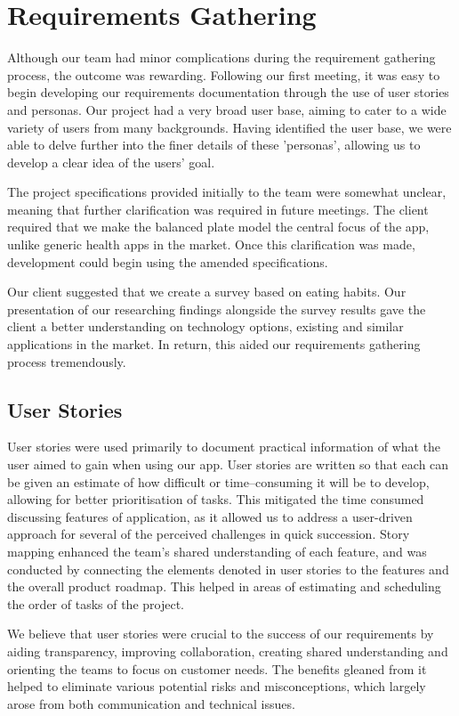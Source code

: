 \documentclass{l3proj}
\begin{document}
\section{Requirements Gathering}
\label{sec:requirements gathering}
Although our team had minor complications during the requirement gathering process, the outcome was rewarding. Following our first meeting, it was easy to begin developing our requirements documentation through the use of user stories and personas. Our project had a very broad user base, aiming to cater to a wide variety of users from many backgrounds. Having identified the user base, we were able to delve further into the finer details of these 'personas', allowing us to develop a clear idea of the users' goal.\par
The project specifications provided initially to the team were somewhat unclear, meaning that further clarification was required in future meetings. The client required that we make the balanced plate model the central focus of the app, unlike generic health apps in the market. Once this clarification was made, development could begin using the amended specifications.\par
Our client suggested that we create a survey based on eating habits. Our presentation of our researching findings alongside the survey results gave the client a better understanding on technology options, existing and similar applications in the market. In return, this aided our requirements gathering process tremendously. \par
\subsection{User Stories}
User stories were used primarily to document practical information of what the user aimed to gain when using our app. User stories are written so that each can be given an estimate of how difficult or time–consuming it will be to develop, allowing for better prioritisation of tasks. This mitigated the time consumed discussing features of application, as it allowed us to address a user-driven approach for several of the perceived challenges in quick succession. Story mapping enhanced the team's shared understanding of each feature, and was conducted by connecting the elements denoted in user stories to the features and the overall product roadmap. This helped in areas of estimating and scheduling the order of tasks of the project.\par
We believe that user stories were crucial to the success of our requirements by aiding transparency, improving collaboration, creating shared understanding and orienting the teams to focus on customer needs. The benefits gleaned from it helped to eliminate various potential risks and misconceptions, which largely arose from both communication and technical issues.\par
\end{document}
